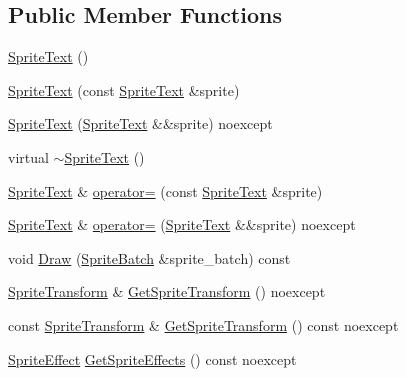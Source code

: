 \subsection*{Public Member Functions}
\begin{DoxyCompactItemize}
\item 
\hyperlink{classmage_1_1rendering_1_1_sprite_text_aa250ee1527cbb9dba2f693df7cedd06f}{Sprite\+Text} ()
\item 
\hyperlink{classmage_1_1rendering_1_1_sprite_text_a60b40732c1a08b88b70335cf91947556}{Sprite\+Text} (const \hyperlink{classmage_1_1rendering_1_1_sprite_text}{Sprite\+Text} \&sprite)
\item 
\hyperlink{classmage_1_1rendering_1_1_sprite_text_ad2bdddde8371d59c85449a9979017f8c}{Sprite\+Text} (\hyperlink{classmage_1_1rendering_1_1_sprite_text}{Sprite\+Text} \&\&sprite) noexcept
\item 
virtual \hyperlink{classmage_1_1rendering_1_1_sprite_text_a6ce8013356e64827767178e01cc2737c}{$\sim$\+Sprite\+Text} ()
\item 
\hyperlink{classmage_1_1rendering_1_1_sprite_text}{Sprite\+Text} \& \hyperlink{classmage_1_1rendering_1_1_sprite_text_a50d21c24a019c0e8dc053a307ec421a6}{operator=} (const \hyperlink{classmage_1_1rendering_1_1_sprite_text}{Sprite\+Text} \&sprite)
\item 
\hyperlink{classmage_1_1rendering_1_1_sprite_text}{Sprite\+Text} \& \hyperlink{classmage_1_1rendering_1_1_sprite_text_a8ced44509f1fa84236b20f1d42add873}{operator=} (\hyperlink{classmage_1_1rendering_1_1_sprite_text}{Sprite\+Text} \&\&sprite) noexcept
\item 
void \hyperlink{classmage_1_1rendering_1_1_sprite_text_afbe374756e97dcec4fcf83f76a0c233b}{Draw} (\hyperlink{classmage_1_1rendering_1_1_sprite_batch}{Sprite\+Batch} \&sprite\+\_\+batch) const
\item 
\hyperlink{classmage_1_1_sprite_transform}{Sprite\+Transform} \& \hyperlink{classmage_1_1rendering_1_1_sprite_text_aab167f1dd0af96e05c34bb631d85e197}{Get\+Sprite\+Transform} () noexcept
\item 
const \hyperlink{classmage_1_1_sprite_transform}{Sprite\+Transform} \& \hyperlink{classmage_1_1rendering_1_1_sprite_text_a9b0bc8d9c8e123d49bd6cc9dcc35c06d}{Get\+Sprite\+Transform} () const noexcept
\item 
\hyperlink{namespacemage_1_1rendering_a4dbc3536c87b906f1d41d863ec458e78}{Sprite\+Effect} \hyperlink{classmage_1_1rendering_1_1_sprite_text_ad9a7ac6ba55ae87a1849b3f1e8e6892b}{Get\+Sprite\+Effects} () const noexcept

\end{DoxyCompactItemize}
